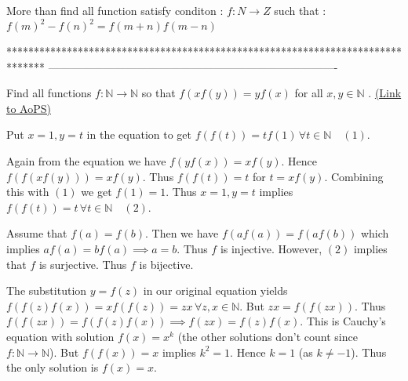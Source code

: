 \begin{solution}
	More than find all function satisfy conditon : 
$ f: N\to Z$ such that : 
$ f(m)^2-f(n)^2=f(m+n)f(m-n)$
\end{solution}
*******************************************************************************
-------------------------------------------------------------------------------

\begin{problem}
	Find all functions $f: \mathbb N \to \mathbb N$ so that $ f(xf(y))=yf(x)$ for all $ x,y \in \mathbb N$ .
	\flushright \href{https://artofproblemsolving.com/community/c6h181906}{(Link to AoPS)}
\end{problem}



\begin{solution}
	Put $ x = 1,y = t$ in the equation to get $ f(f(t)) = tf(1)\,\forall t\in\mathbb N\quad(1)$.

Again from the equation we have $ f(yf(x)) = xf(y)$. Hence $ f(f(xf(y))) = xf(y)$. Thus $ f(f(t)) = t$ for $ t = xf(y)$. Combining this with $ (1)$ we get $ f(1) = 1$. Thus $ x = 1,y = t$ implies $ f(f(t)) = t\,\forall t\in\mathbb N\quad(2)$.

Assume that $ f(a) = f(b)$. Then we have $ f(af(a)) = f(af(b))$ which implies $ af(a) = bf(a)\implies a = b$. Thus $ f$ is injective. However, $ (2)$ implies that $ f$ is surjective. Thus $ f$ is bijective.

The substitution $ y = f(z)$ in our original equation yields $ f(f(z)f(x)) = xf(f(z)) = zx\,\forall z,x\in\mathbb N$. But $ zx = f(f(zx))$. Thus $ f(f(zx)) = f(f(z)f(x))\implies f(zx) = f(z)f(x)$. This is Cauchy's equation with solution  $ f(x) = x^k$ (the other solutions don't count since $ f: \mathbb N\to\mathbb N$). But $ f(f(x)) = x$ implies $ k^2 = 1$. Hence $ k = 1$ (as $ k\neq -1$). Thus the only solution is $ \boxed{f(x) = x}$.
\end{solution}



